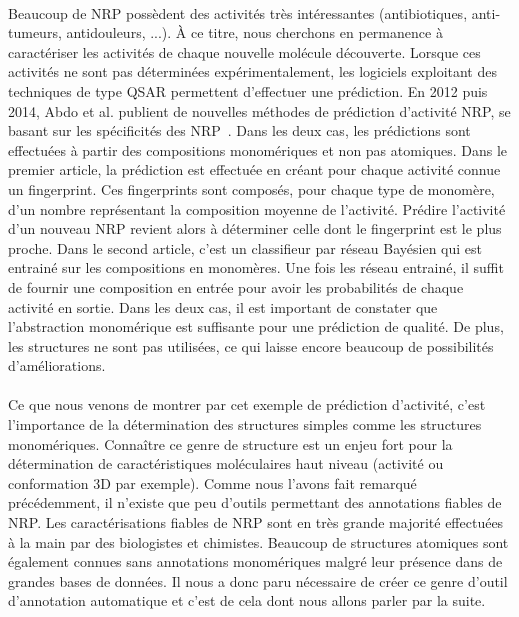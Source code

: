 \documentclass[12pt,french,twoside]{report}
\begin{document}
\paragraph{}Beaucoup de NRP possèdent des activités très intéressantes (antibiotiques, anti-tumeurs, antidouleurs, ...).
À ce titre, nous cherchons en permanence à caractériser les activités de chaque nouvelle molécule découverte.
Lorsque ces activités ne sont pas déterminées expérimentalement, les logiciels exploitant des techniques de type QSAR permettent d'effectuer une prédiction.
En 2012 puis 2014, Abdo et al. publient de nouvelles méthodes de prédiction d'activité NRP, se basant sur les spécificités des NRP~\cite{abdo_new_2012, abdo_prediction_2014}.
Dans les deux cas, les prédictions sont effectuées à partir des compositions monomériques et non pas atomiques.
Dans le premier article, la prédiction est effectuée en créant pour chaque activité connue un fingerprint.
Ces fingerprints sont composés, pour chaque type de monomère, d'un nombre représentant la composition moyenne de l'activité. 
Prédire l'activité d'un nouveau NRP revient alors à déterminer celle dont le fingerprint est le plus proche.
Dans le second article, c'est un classifieur par réseau Bayésien qui est entrainé sur les compositions en monomères.
Une fois les réseau entrainé, il suffit de fournir une composition en entrée pour avoir les probabilités de chaque activité en sortie.
Dans les deux cas, il est important de constater que l'abstraction monomérique est suffisante pour une prédiction de qualité.
De plus, les structures ne sont pas utilisées, ce qui laisse encore beaucoup de possibilités d'améliorations.

\paragraph{}Ce que nous venons de montrer par cet exemple de prédiction d'activité, c'est l'importance de la détermination des structures simples comme les structures monomériques.
Connaître ce genre de structure est un enjeu fort pour la détermination de caractéristiques moléculaires haut niveau (activité ou conformation 3D par exemple).
Comme nous l'avons fait remarqué précédemment, il n'existe que peu d'outils permettant des annotations fiables de NRP.
Les caractérisations fiables de NRP sont en très grande majorité effectuées à la main par des biologistes et chimistes.
Beaucoup de structures atomiques sont également connues sans annotations monomériques malgré leur présence dans de grandes bases de données.
Il nous a donc paru nécessaire de créer ce genre d'outil d'annotation automatique et c'est de cela dont nous allons parler par la suite.
\end{document}
